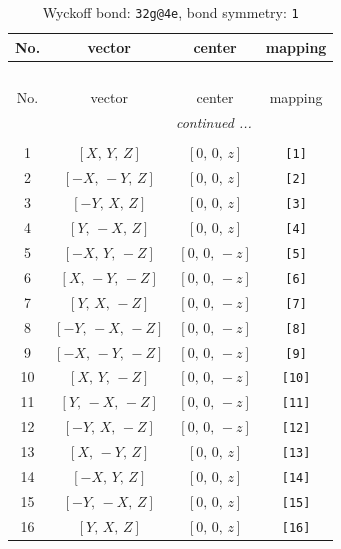 \documentclass[fleqn,8pt]{jsarticle}
\begin{document}
\begin{longtable}{cccc}
\caption{Wyckoff bond: {\tt 32g@4e}, bond symmetry: {\tt 1}}
 \\
 \hline \hline
No. & vector & center & mapping \\ \hline \endfirsthead

\multicolumn{3}{l}{\tablename\ \thetable{}} \\
 \hline \hline
No. & vector & center & mapping \\ \hline \endhead

 \hline \hline
\multicolumn{3}{r}{\footnotesize\it continued ...} \\ \endfoot

 \hline \hline
\multicolumn{3}{r}{} \\ \endlastfoot

1 & $\left[ X,\, Y,\, Z \right]$ & $\left[ 0,\, 0,\, z \right]$ & {\tt [1]} \\ \hline
2 & $\left[ - X,\, - Y,\, Z \right]$ & $\left[ 0,\, 0,\, z \right]$ & {\tt [2]} \\ \hline
3 & $\left[ - Y,\, X,\, Z \right]$ & $\left[ 0,\, 0,\, z \right]$ & {\tt [3]} \\ \hline
4 & $\left[ Y,\, - X,\, Z \right]$ & $\left[ 0,\, 0,\, z \right]$ & {\tt [4]} \\ \hline
5 & $\left[ - X,\, Y,\, - Z \right]$ & $\left[ 0,\, 0,\, - z \right]$ & {\tt [5]} \\ \hline
6 & $\left[ X,\, - Y,\, - Z \right]$ & $\left[ 0,\, 0,\, - z \right]$ & {\tt [6]} \\ \hline
7 & $\left[ Y,\, X,\, - Z \right]$ & $\left[ 0,\, 0,\, - z \right]$ & {\tt [7]} \\ \hline
8 & $\left[ - Y,\, - X,\, - Z \right]$ & $\left[ 0,\, 0,\, - z \right]$ & {\tt [8]} \\ \hline
9 & $\left[ - X,\, - Y,\, - Z \right]$ & $\left[ 0,\, 0,\, - z \right]$ & {\tt [9]} \\ \hline
10 & $\left[ X,\, Y,\, - Z \right]$ & $\left[ 0,\, 0,\, - z \right]$ & {\tt [10]} \\ \hline
11 & $\left[ Y,\, - X,\, - Z \right]$ & $\left[ 0,\, 0,\, - z \right]$ & {\tt [11]} \\ \hline
12 & $\left[ - Y,\, X,\, - Z \right]$ & $\left[ 0,\, 0,\, - z \right]$ & {\tt [12]} \\ \hline
13 & $\left[ X,\, - Y,\, Z \right]$ & $\left[ 0,\, 0,\, z \right]$ & {\tt [13]} \\ \hline
14 & $\left[ - X,\, Y,\, Z \right]$ & $\left[ 0,\, 0,\, z \right]$ & {\tt [14]} \\ \hline
15 & $\left[ - Y,\, - X,\, Z \right]$ & $\left[ 0,\, 0,\, z \right]$ & {\tt [15]} \\ \hline
16 & $\left[ Y,\, X,\, Z \right]$ & $\left[ 0,\, 0,\, z \right]$ & {\tt [16]} \\
\end{longtable}
\end{document}
